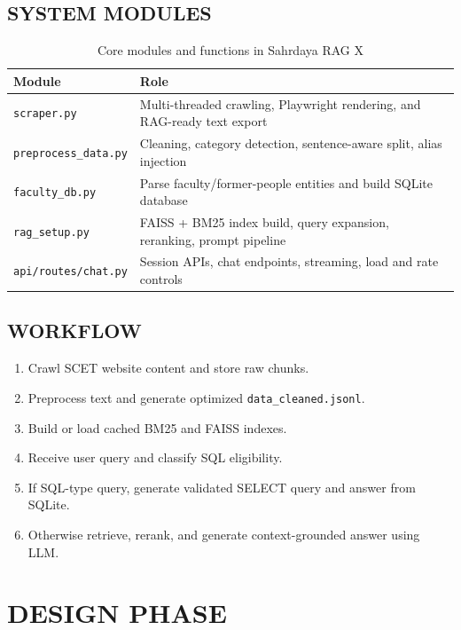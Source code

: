 \documentclass[12pt,a4paper]{report}
\begin{document}
\section{SYSTEM MODULES}
\begin{table}[h!]
\centering
\caption{Core modules and functions in Sahrdaya RAG X}
\begin{tabular}{|p{4.2cm}|p{9.4cm}|}
\hline
\textbf{Module} & \textbf{Role} \\
\hline
\texttt{scraper.py} & Multi-threaded crawling, Playwright rendering, and RAG-ready text export \\
\hline
\texttt{preprocess\_data.py} & Cleaning, category detection, sentence-aware split, alias injection \\
\hline
\texttt{faculty\_db.py} & Parse faculty/former-people entities and build SQLite database \\
\hline
\texttt{rag\_setup.py} & FAISS + BM25 index build, query expansion, reranking, prompt pipeline \\
\hline
\texttt{api/routes/chat.py} & Session APIs, chat endpoints, streaming, load and rate controls \\
\hline
\end{tabular}
\end{table}

\section{WORKFLOW}
\begin{enumerate}
    \item Crawl SCET website content and store raw chunks.
    \item Preprocess text and generate optimized \texttt{data\_cleaned.jsonl}.
    \item Build or load cached BM25 and FAISS indexes.
    \item Receive user query and classify SQL eligibility.
    \item If SQL-type query, generate validated SELECT query and answer from SQLite.
    \item Otherwise retrieve, rerank, and generate context-grounded answer using LLM.
\end{enumerate}

\chapter{DESIGN PHASE}
\thispagestyle{fancy}
\onehalfspacing
\end{document}
